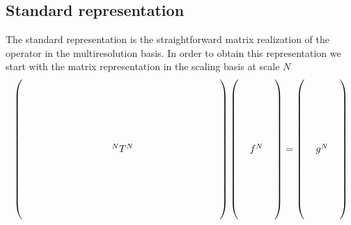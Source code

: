 \subsection{Standard representation}
The standard representation is the straightforward matrix realization of the operator in the 
multiresolution basis. In order to obtain this representation we start with the matrix 
representation in the scaling basis at scale $N$
\begin{equation}
\begin{split} 
    \label{eq:Tmatrix}
    \left(
    \begin{array}{c}
	$\multirow{12}{*}{$
	\ \ \ \ \ \  \ \ \ \ \ \ \ \ \ \ \ \ \ \ \ \ \ \ \ \ \T{N}{N}
	\ \ \ \ \ \ \ \ \ \ \ \ \ \ \ \ \ \ \ \ \ \ \ \ \ $}$
	\\ \\ \\ \\ \\ \\ \\ \\ \\ \\ \\ \\
    \end{array}
    \right) 
    \left(
    \begin{array}{c}
	$\multirow{12}{*}{$\ \ f^N\ \ $}$\\ \\ \\ \\ \\ \\ \\ \\ \\ \\ \\ \\
    \end{array}
    \right)
    = 
    \left(
    \begin{array}{c}
	$\multirow{12}{*}{$\ \ g^N\ \ $}$\\ \\ \\ \\ \\ \\ \\ \\ \\ \\ \\ \\
    \end{array}
    \right)
\end{split}
\end{equation}
